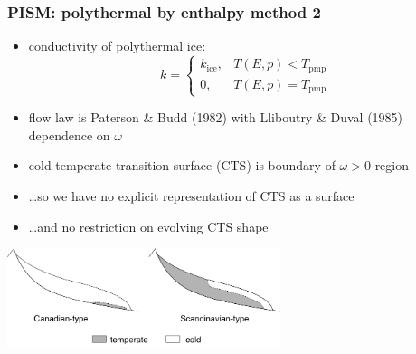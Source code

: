 \documentclass{beamer}
\begin{document}
\begin{frame}
  \frametitle{PISM: polythermal by enthalpy method 2}

\small
\begin{itemize}
\item conductivity of polythermal ice:
	$$k = \begin{cases}
	k_{\text{ice}}, & T(E,p) < T_{\text{pmp}}\\
	0, & T(E,p) = T_{\text{pmp}}
	\end{cases}$$
\item flow law is Paterson \& Budd (1982) with Lliboutry \& Duval (1985) dependence on $\omega$
\item cold-temperate transition surface (CTS) is boundary of $\omega > 0$ region
\item \dots so we have no explicit representation of CTS as a surface
\item \dots and no restriction on evolving CTS shape
\end{itemize}
\vspace{0.2in}

\begin{center}
  \includegraphics[width=0.6\textwidth]{polythermal_types}
\end{center}
\end{frame}
\end{document}
